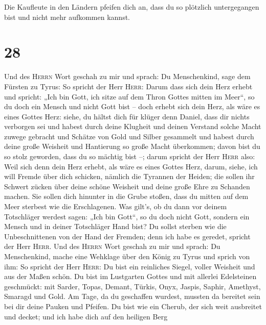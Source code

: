  Die Kaufleute in den Ländern pfeifen dich an, dass du so
plötzlich untergegangen bist und nicht mehr aufkommen kannst.

\hypertarget{section-27}{%
\section{28}\label{section-27}}

 Und des \textsc{Herrn} Wort geschah zu mir und sprach:
 Du Menschenkind, sage dem Fürsten zu Tyrus: So spricht
der Herr \textsc{Herr}: Darum dass sich dein Herz erhebt und spricht:
„Ich bin Gott, ich sitze auf dem Thron Gottes mitten im Meer``, so du
doch ein Mensch und nicht Gott bist -- doch erhebt sich dein Herz, als
wäre es eines Gottes Herz:  siehe, du hältst dich für
klüger denn Daniel, dass dir nichts verborgen sei  und
habest durch deine Klugheit und deinen Verstand solche Macht zuwege
gebracht und Schätze von Gold und Silber gesammelt  und
habest durch deine große Weisheit und Hantierung so große Macht
überkommen; davon bist du so stolz geworden, dass du so mächtig bist --;
 darum spricht der Herr \textsc{Herr} also: Weil sich denn
dein Herz erhebt, als wäre es eines Gottes Herz,  darum,
siehe, ich will Fremde über dich schicken, nämlich die Tyrannen der
Heiden; die sollen ihr Schwert zücken über deine schöne Weisheit und
deine große Ehre zu Schanden machen.  Sie sollen dich
hinunter in die Grube stoßen, dass du mitten auf dem Meer sterbest wie
die Erschlagenen.  Was gilt's, ob du dann vor deinem
Totschläger werdest sagen: „Ich bin Gott``, so du doch nicht Gott,
sondern ein Mensch und in deiner Totschläger Hand bist? 
Du sollst sterben wie die Unbeschnittenen von der Hand der Fremden; denn
ich habe es geredet, spricht der Herr \textsc{Herr}.  Und
des \textsc{Herrn} Wort geschah zu mir und sprach:  Du
Menschenkind, mache eine Wehklage über den König zu Tyrus und sprich von
ihm: So spricht der Herr \textsc{Herr}: Du bist ein reinliches Siegel,
voller Weisheit und aus der Maßen schön.  Du bist im
Lustgarten Gottes und mit allerlei Edelsteinen geschmückt: mit Sarder,
Topas, Demant, Türkis, Onyx, Jaspis, Saphir, Amethyst, Smaragd und Gold.
Am Tage, da du geschaffen wurdest, mussten da bereitet sein bei dir
deine Pauken und Pfeifen.  Du bist wie ein Cherub, der
sich weit ausbreitet und decket; und ich habe dich auf den heiligen Berg

